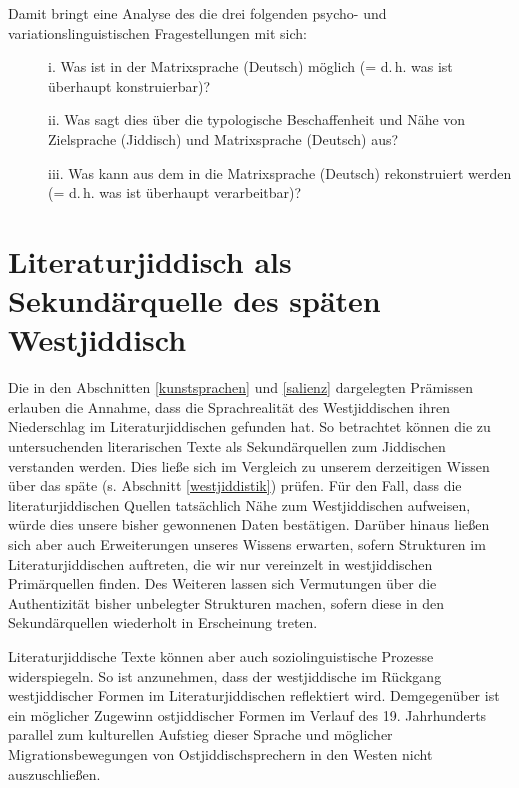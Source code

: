 Damit bringt eine Analyse des \hai{{\LiJi}} die drei folgenden psycho- und variationslinguistischen Fragestellungen mit sich:

\begin{description}
\item [] i. Was ist in der Matrixsprache (Deutsch) möglich (= d.\,h. was ist überhaupt konstruierbar)?
\item [] ii. Was sagt dies über die typologische Beschaffenheit und Nähe von Zielsprache (Jiddisch) und Matrixsprache (Deutsch) aus?
\item [] iii. Was kann aus dem \hai{{\LiJi}} in die Matrixsprache (Deutsch) rekonstruiert werden (= d.\,h. was ist überhaupt verarbeitbar)?
\end{description} 


 
\section{Literaturjiddisch als Sekundärquelle des späten Westjiddisch}\label{secundärquelle}
 
Die in den Abschnitten \ref{kunstsprachen} und \ref{salienz} dargelegten Prämissen erlauben die Annahme, dass die Sprachrealität des Westjiddischen ihren Niederschlag im Literaturjiddischen gefunden hat. So betrachtet können die zu untersuchenden literarischen Texte als Sekundärquellen zum Jiddischen verstanden werden. Dies ließe sich im Vergleich zu unserem derzeitigen Wissen über das späte  (s. Abschnitt \ref{westjiddistik}) prüfen. Für den Fall, dass die literaturjiddischen Quellen tatsächlich Nähe zum Westjiddischen aufweisen, würde dies unsere bisher gewonnenen Daten bestätigen. Darüber hinaus ließen sich aber auch Erweiterungen unseres Wissens erwarten, sofern Strukturen im Literaturjiddischen auftreten, die wir nur vereinzelt in westjiddischen Primärquellen finden. Des Weiteren lassen sich Vermutungen über die Authentizität bisher unbelegter Strukturen machen, sofern diese in den Sekundärquellen wiederholt in Erscheinung treten.

Literaturjiddische Texte können aber auch soziolinguistische Prozesse widerspiegeln. So ist anzunehmen, dass der westjiddische  im Rückgang westjiddischer Formen im Literaturjiddischen reflektiert wird. Demgegenüber ist ein möglicher Zugewinn ostjiddischer Formen im Verlauf des 19. Jahrhunderts parallel zum kulturellen Aufstieg dieser Sprache und möglicher Migrationsbewegungen von Ostjiddischsprechern in den Westen nicht auszuschließen.

